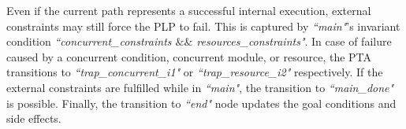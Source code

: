 \documentclass[letterpaper]{article}
\begin{document}
Even if the current path represents a successful internal execution, external constraints may still force the PLP to fail. This is captured by \textit{``main"}'s invariant condition \textit{``concurrent\_constraints $\&\&$ resources\_constraints"}. In case of failure caused by a concurrent condition, concurrent module, or resource, the PTA transitions to \textit{``trap\_concurrent\_i1"} or \textit{``trap\_resource\_i2"} respectively. If the external constraints are fulfilled while in \textit{``main"}, the transition to \textit{``main\_done"} is possible. Finally, the transition to \textit{``end"} node updates the goal conditions and side effects.
\end{document}
